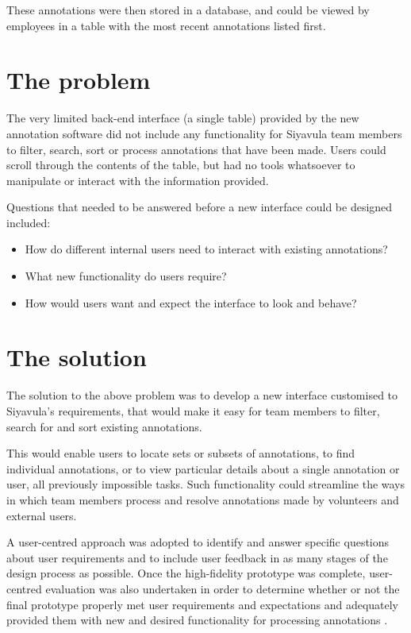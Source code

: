 These annotations were then stored in a database, and could be viewed by employees in a table  with the most recent annotations listed first. 

\section{The problem}
The very limited back-end interface (a single table) provided by the new annotation software did not include any functionality for Siyavula team members to filter, search, sort or process  annotations that have been made. Users could scroll through the contents of the table, but had no tools whatsoever to manipulate or interact with the information provided. 

Questions that needed to be answered before a new interface could be designed included: 
\begin{itemize}
 \item How do different internal users need to interact with existing annotations? 
 \item What new functionality do users require? 
 \item How would users want and expect the interface to look and behave?
\end{itemize}


\section{The solution}
The solution to the above problem was to develop a new interface customised to Siyavula's requirements, that would make it easy for team members to filter, search for and sort existing annotations. 

This would enable users to locate sets or subsets of annotations, to find individual annotations, or to view particular details about a single annotation or user, all previously impossible tasks. Such functionality could streamline the ways in which team members process and resolve annotations made by volunteers and external users.

A user-centred approach was adopted to identify and answer specific questions about user requirements and to include user feedback in as many stages of the design process as possible. Once the high-fidelity prototype was complete, user-centred evaluation was also undertaken in order to determine whether or not the final prototype properly met user requirements and expectations and adequately provided them with new and desired functionality for processing annotations \citep[p.~327]{RogersPreece}. 


